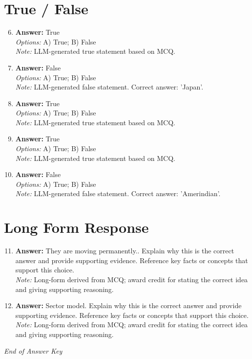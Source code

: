 \documentclass[12pt]{article}
\begin{document}
\section*{True / False}
\begin{enumerate}[label=\arabic*.]
\setcounter{enumi}{5}
\item \textbf{Answer:} True
\\ \textit{Options:} A) True; B) False
\\ \textit{Note:} LLM-generated true statement based on MCQ.
\item \textbf{Answer:} False
\\ \textit{Options:} A) True; B) False
\\ \textit{Note:} LLM-generated false statement. Correct answer: 'Japan'.
\item \textbf{Answer:} True
\\ \textit{Options:} A) True; B) False
\\ \textit{Note:} LLM-generated true statement based on MCQ.
\item \textbf{Answer:} True
\\ \textit{Options:} A) True; B) False
\\ \textit{Note:} LLM-generated true statement based on MCQ.
\item \textbf{Answer:} False
\\ \textit{Options:} A) True; B) False
\\ \textit{Note:} LLM-generated false statement. Correct answer: 'Amerindian'.
\end{enumerate}

\section*{Long Form Response}
\begin{enumerate}[label=\arabic*.]
\setcounter{enumi}{10}
\item \textbf{Answer:} They are moving permanently.. Explain why this is the correct answer and provide supporting evidence. Reference key facts or concepts that support this choice.
\\ \textit{Note:} Long-form derived from MCQ; award credit for stating the correct idea and giving supporting reasoning.
\item \textbf{Answer:} Sector model. Explain why this is the correct answer and provide supporting evidence. Reference key facts or concepts that support this choice.
\\ \textit{Note:} Long-form derived from MCQ; award credit for stating the correct idea and giving supporting reasoning.
\end{enumerate}

\vfill
\noindent\textit{End of Answer Key}
\end{document}
